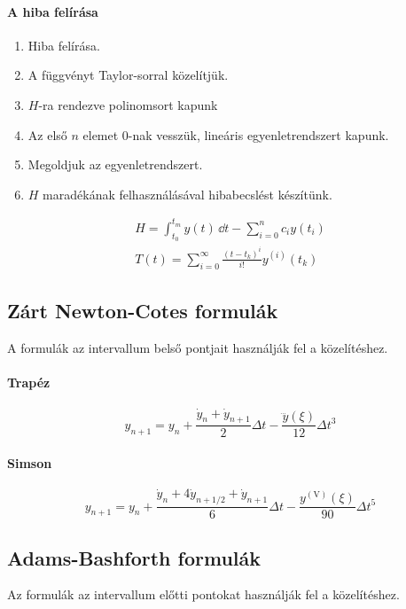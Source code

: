 \documentclass[../../main.tex]{subfiles}
\begin{document}
\paragraph{A hiba felírása}
\begin{enumerate}
  \item Hiba felírása.
  \item A függvényt Taylor-sorral közelítjük.
  \item $H$-ra rendezve polinomsort kapunk
  \item Az első $n$ elemet 0-nak vesszük, lineáris egyenletrendszert kapunk.
  \item Megoldjuk az egyenletrendszert.
  \item $H$ maradékának felhasználásával hibabecslést készítünk.
\end{enumerate}
\begin{gather*}
  H
  = \int_{t_0}^{t_m} y(t) \, \dd t
  - \sum_{i=0}^n c_i y(t_i)
  \\
  T(t)
  = \sum_{i=0}^\infty \frac{(t - t_k)^i}{i!}y^{(i)}(t_k)
\end{gather*}

\subsection{Zárt Newton-Cotes formulák}

A  formulák az intervallum belső pontjait használják
fel a közelítéshez.

\paragraph{Trapéz}
\[
  y_{n + 1}
  = y_n
  + \frac{\dot y_n + \dot y_{n + 1}}{2} \Delta t
  - \frac{\dddot y(\xi)}{12} \Delta t^3
\]

\paragraph{Simson}
\[
  y_{n + 1}
  = y_n
  + \frac{\dot y_n +  4 \dot y_{n + 1/2} + \dot y_{n + 1}}{6} \Delta t
  - \frac{y^{(\mathrm{V})}(\xi)}{90} \Delta t^5
\]

\subsection{Adams-Bashforth formulák}

Az  formulák az intervallum előtti pontokat használják
fel a közelítéshez.
\end{document}
